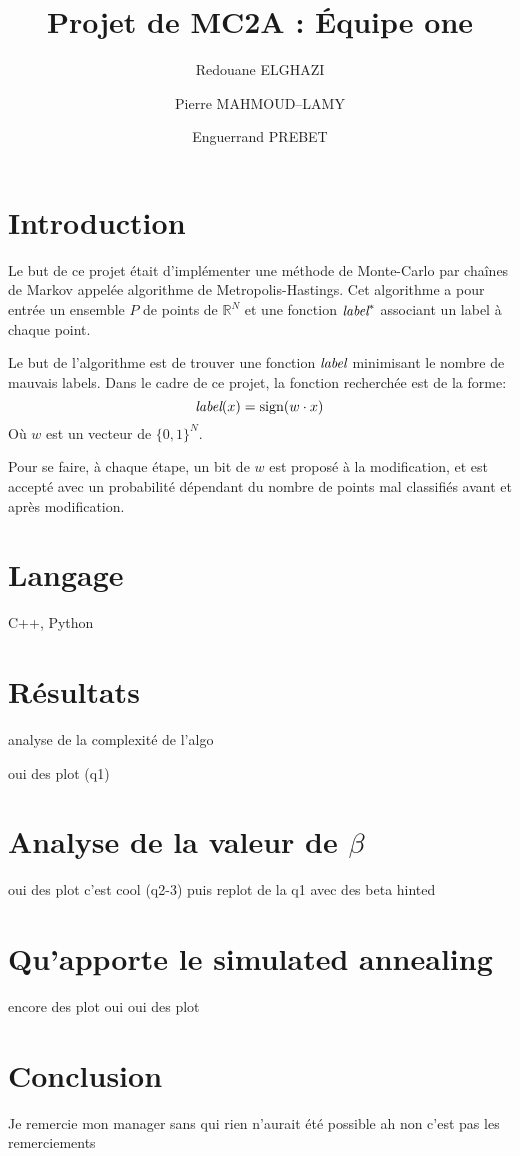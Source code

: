 \documentclass[twocolumn]{article}
\date{}
\author{Redouane ELGHAZI \and Pierre MAHMOUD--LAMY \and Enguerrand PREBET}
\title{Projet de MC2A : Équipe one}
\begin{document}
	\maketitle
	\section{Introduction}
		Le but de ce projet était d'implémenter une méthode de Monte-Carlo par chaînes de Markov appelée algorithme de Metropolis-Hastings. Cet algorithme a pour entrée un ensemble $P$ de points de $\mathbb{R}^N$ et une fonction $\emph{label}^*$ associant un label à chaque point.
		
		Le but de l'algorithme est de trouver une fonction $\emph{label}$ minimisant le nombre de mauvais labels. Dans le cadre de ce projet, la fonction recherchée est de la forme:
		$$\emph{label}(x) = \text{sign}(w\cdot x)$$
		Où $w$ est un vecteur de $\big\{0,1\big\}^N$.
		 
		Pour se faire, à chaque étape, un bit de $w$ est proposé à la modification, et est accepté avec un probabilité dépendant du nombre de points mal classifiés avant et après modification.
	\section{Langage}
		C++, Python
	\section{Résultats}
		analyse de la complexité de l'algo
		
		oui des plot (q1)
	\section{Analyse de la valeur de $\beta$}
		oui des plot c'est cool (q2-3)
		puis replot de la q1 avec des beta hinted
	\section{Qu'apporte le simulated annealing}
		encore des plot oui oui des plot
		
	\section{Conclusion}
		Je remercie mon manager sans qui rien n'aurait été possible ah non c'est pas les remerciements
\end{document}
